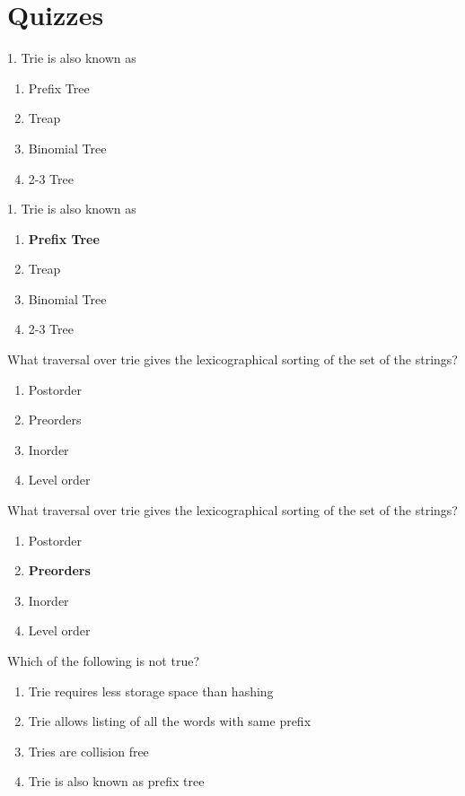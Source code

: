 \section{Quizzes}
\begin{frame}{1. Trie is also known as}
    
    \begin{enumerate}[label=\alph*.]
    \item Prefix Tree
    \item Treap
    \item Binomial Tree
    \item 2-3 Tree
\end{enumerate}
\end{frame}
\begin{frame}{1. Trie is also known as}
    \begin{enumerate}[label=\alph*.]
    \item \textbf{Prefix Tree}
    \item Treap
    \item Binomial Tree
    \item 2-3 Tree
\end{enumerate}
\end{frame}
\begin{frame}{ What traversal over trie gives the lexicographical sorting of the set of the strings?}
    \begin{enumerate}[label=\alph*.]
        \item Postorder
        \item Preorders
        \item Inorder
        \item Level order
    \end{enumerate}
\end{frame}
\begin{frame}{ What traversal over trie gives the lexicographical sorting of the set of the strings?}
    \begin{enumerate}[label=\alph*.]
        \item Postorder
        \item \textbf{Preorders}
        \item Inorder
        \item Level order
    \end{enumerate}
\end{frame}
\begin{frame}{Which of the following is not true?}
     \begin{enumerate}[label=\alph*.]
        \item Trie requires less storage space than hashing
        \item Trie allows listing of all the words with same prefix
        \item Tries are collision free
        \item Trie is also known as prefix tree
     \end{enumerate}
\end{frame}
